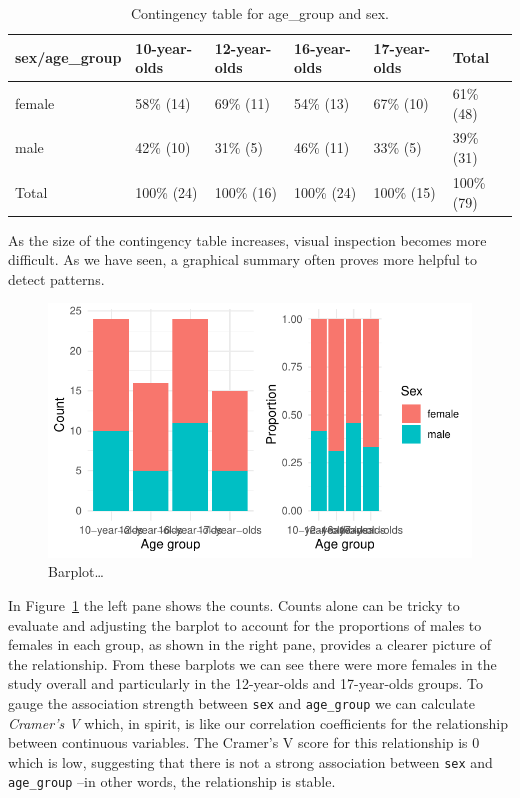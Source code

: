 \documentclass[
  letterpaper,
]{scrbook}
\begin{document}
\hypertarget{tbl-summaries-bivariate-categorical-table-belc}{}
\begin{table}
\caption{\label{tbl-summaries-bivariate-categorical-table-belc}Contingency table for age\_group and sex. }\tabularnewline

\centering
\begin{tabular}{llllll}
\toprule
sex/age\_group & 10-year-olds & 12-year-olds & 16-year-olds & 17-year-olds & Total\\
\midrule
female & 58\% (14) & 69\% (11) & 54\% (13) & 67\% (10) & 61\% (48)\\
male & 42\% (10) & 31\%  (5) & 46\% (11) & 33\%  (5) & 39\% (31)\\
Total & 100\% (24) & 100\% (16) & 100\% (24) & 100\% (15) & 100\% (79)\\
\bottomrule
\end{tabular}
\end{table}

As the size of the contingency table increases, visual inspection
becomes more difficult. As we have seen, a graphical summary often
proves more helpful to detect patterns.

\begin{figure}[h]

{\centering \includegraphics{./approaching-analysis_files/figure-pdf/fig-summaries-bivariate-categorical-barplot-belc-1.pdf}

}

\caption{\label{fig-summaries-bivariate-categorical-barplot-belc}Barplot\ldots{}}

\end{figure}

In Figure~\ref{fig-summaries-bivariate-categorical-barplot-belc} the
left pane shows the counts. Counts alone can be tricky to evaluate and
adjusting the barplot to account for the proportions of males to females
in each group, as shown in the right pane, provides a clearer picture of
the relationship. From these barplots we can see there were more females
in the study overall and particularly in the 12-year-olds and
17-year-olds groups. To gauge the association strength between
\texttt{sex} and \texttt{age\_group} we can calculate \emph{Cramer's V}
which, in spirit, is like our correlation coefficients for the
relationship between continuous variables. The Cramer's V score for this
relationship is 0 which is low, suggesting that there is not a strong
association between \texttt{sex} and \texttt{age\_group} --in other
words, the relationship is stable.
\end{document}
